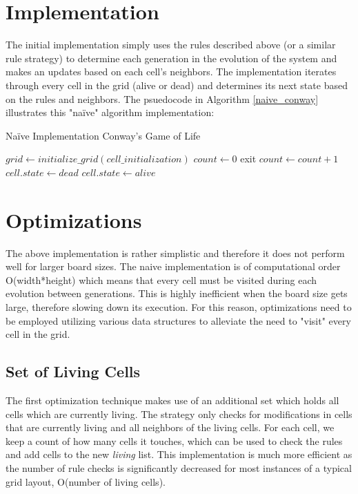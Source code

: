 \documentclass[11pt]{article}
\begin{document}
\section{Implementation}
The initial implementation simply uses the rules described above (or a similar rule strategy) to determine each generation in the evolution of the system and makes an updates based on each cell's neighbors.  The implementation iterates through every cell in the grid (alive or dead) and determines its next state based on the rules and neighbors.  The psuedocode in Algorithm \ref{naive_conway} illustrates this "naïve" algorithm implementation:
\begin{algorithm}
	\caption{Naïve Implementation Conway's Game of Life}\label{naive_conway}
	\begin{algorithmic}[1]
			\State $grid\gets initialize\_grid(cell\_initialization)$
			\State $count\gets 0$
					\State exit
				\EndIf
				\State $count\gets count+1$
								\State $cell.state\gets dead$
							\EndIf
						\Else
								\State $cell.state\gets alive$
							\EndIf
						\EndIf
					\EndFor
				\EndFor
			\EndWhile\label{naiveendwhile}
		\EndProcedure
	\end{algorithmic}
\end{algorithm}

\section{Optimizations}
The above implementation is rather simplistic and therefore it does not perform well for larger board sizes.  The naive implementation is of computational order O(width*height) which means that every cell must be visited during each evolution between generations.  This is highly inefficient when the board size gets large, therefore slowing down its execution.  For this reason, optimizations need to be employed utilizing various data structures to alleviate the need to "visit" every cell in the grid.
\subsection*{Set of Living Cells}
The first optimization technique makes use of an additional set which holds all cells which are currently living.  The strategy only checks for modifications in cells that are currently living and all neighbors of the living cells.  For each cell, we keep a count of how many cells it touches, which can be used to check the rules and add cells to the new \textit{living} list.  This implementation is much more efficient as the number of rule checks is significantly decreased for most instances of a typical grid layout, O(number of living cells).
\end{document}
